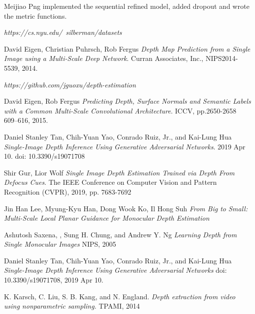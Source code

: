 \documentclass{article}
\begin{document}
    Meijiao Png implemented the sequential refined model, added dropout and wrote the metric functions. 

\medskip
\small
\begin{thebibliography}{8}

\textit{https://cs.nyu.edu/~silberman/datasets}
 
David Eigen, Christian Puhrsch, Rob Fergus
\textit{Depth Map Prediction from a Single Image using a Multi-Scale Deep Network}.
Curran Associates, Inc., NIPS2014-5539, 2014.

\textit{https://github.com/jguoxu/depth-estimation}

David Eigen, Rob Fergus
\textit{Predicting Depth, Surface Normals and Semantic Labels with a Common Multi-Scale Convolutional Architecture}. 
ICCV, pp.2650-2658 609--616, 2015.

Daniel Stanley Tan, Chih-Yuan Yao, Conrado Ruiz, Jr., and Kai-Lung Hua
\textit{Single-Image Depth Inference Using Generative Adversarial Networks}.
2019 Apr 10. doi: 10.3390/s19071708

Shir Gur, Lior Wolf
\textit{Single Image Depth Estimation Trained via Depth From Defocus Cues}.
The IEEE Conference on Computer Vision and Pattern Recognition (CVPR), 2019, pp. 7683-7692

Jin Han Lee, Myung-Kyu Han, Dong Wook Ko, Il Hong Suh 
\textit{From Big to Small: Multi-Scale Local Planar Guidance for Monocular Depth Estimation}

Ashutosh Saxena, , Sung H. Chung, and Andrew Y. Ng
\textit{Learning Depth from Single Monocular Images}
NIPS, 2005

Daniel Stanley Tan, Chih-Yuan Yao, Conrado Ruiz, Jr., and Kai-Lung Hua 
\textit{Single-Image Depth Inference Using Generative Adversarial Networks}
doi: 10.3390/s19071708, 2019 Apr 10.

K. Karsch, C. Liu, S. B. Kang, and N. England. 
\textit{Depth extraction from video using nonparametric sampling.}
TPAMI, 2014
\end{thebibliography}

\end{document}
